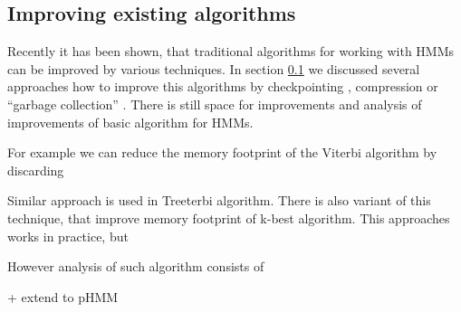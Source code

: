 



%

\subsection{Improving existing algorithms}

Recently it has been shown, that traditional algorithms for working with HMMs
can be improved by various techniques. In section \ref{} we discussed several
approaches how to improve this algorithms by checkpointing \cite{}, compression
\cite{} or ``garbage collection'' \cite{}. There is still space for improvements
and analysis of improvements of basic algorithm for HMMs.


For example we can reduce the memory
footprint of the Viterbi algorithm by discarding 

Similar approach is used in Treeterbi algorithm. There is also variant of this
technique, that improve memory footprint of k-best algorithm. This approaches
works in practice, but 

However analysis of such algorithm consists of 

+ extend to pHMM







\label{LastPage}
